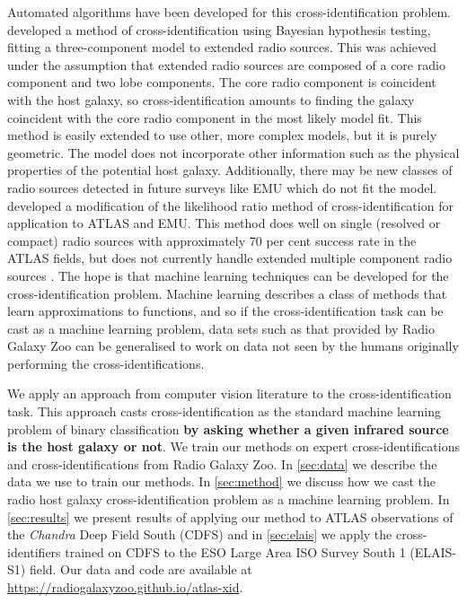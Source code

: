 \documentclass[fleqn,usenatbib,usedcolumn]{mnras}
\newcommand{\edited}[1]{{\bf {#1}}}
\begin{document}
  Automated algorithms have been developed for this cross-identification
  problem. \citet{fan15} developed a method of cross-identification using
  Bayesian hypothesis testing, fitting a three-component model to extended
  radio sources. This was achieved under the assumption that extended radio
  sources are composed of a core radio component and two lobe components. The
  core radio component is coincident with the host galaxy, so
  cross-identification amounts to finding the galaxy coincident with the core
  radio component in the most likely model fit. This method is easily extended
  to use other, more complex models, but it is purely geometric. The model
  does not incorporate other information such as the physical properties of
  the potential host galaxy. Additionally, there may be new classes of radio
  sources detected in future surveys like EMU which do not fit the model.
  \citet{weston18lrpy} developed a modification of the likelihood ratio method of
  cross-identification \citep{richter75likelihood} for application to ATLAS
  and EMU. This method does well on single (resolved or compact) radio sources
  with approximately 70 per cent success rate in the ATLAS fields, but does
  not currently handle extended multiple component radio sources
  \citep{norris17unexpected}. The hope is that machine learning techniques can
  be developed for the cross-identification problem. Machine learning
  describes a class of methods that learn approximations to functions, and so
  if the cross-identification task can be cast as a machine learning problem,
  data sets such as that provided by Radio Galaxy Zoo can be generalised to
  work on data not seen by the humans originally performing the cross-identifications.

  We apply an approach from computer vision literature to the
  cross-identification task. This approach casts cross-identification as the
  standard machine learning problem of binary classification \edited{by asking whether a given infrared source is the host galaxy or not}. We train our
  methods on expert cross-identifications and cross-identifications from Radio
  Galaxy Zoo. In \autoref{sec:data} we describe the data we use to train our
  methods. In \autoref{sec:method} we discuss how we cast the radio host
  galaxy cross-identification problem as a machine learning problem. In
  \autoref{sec:results} we present results of applying our method to ATLAS
  observations of the \emph{Chandra} Deep Field South (CDFS) and in
  \autoref{sec:elais} we apply the cross-identifiers trained on CDFS to the
  ESO Large Area ISO Survey South 1 (ELAIS-S1) field. Our data and code are
  available at \url{https://radiogalaxyzoo.github.io/atlas-xid}.
\end{document}
